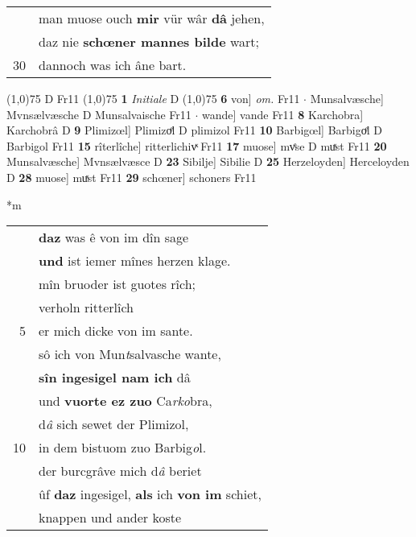 \documentclass[8pt,a4paper,notitlepage]{article}
\begin{document}
\begin{table}[ht]
\begin{minipage}[t]{0.5\linewidth}
\begin{tabular}{rl}
 & man muose ouch \textbf{mir} vür wâr \textbf{dâ} jehen,\\ 
 & daz nie \textbf{schœner mannes bilde} wart;\\ 
30 & dannoch was ich âne bart.\\ 
\end{tabular}
\scriptsize
\line(1,0){75} \newline
D Fr11 \newline
\line(1,0){75} \newline
\textbf{1} \textit{Initiale} D  \newline
\line(1,0){75} \newline
\textbf{6} von] \textit{om.} Fr11  $\cdot$ Munsalvæsche] Mvnsælvæsche D Munsalvaische Fr11  $\cdot$ wande] vande Fr11 \textbf{8} Karchobra] Karchobrâ D \textbf{9} Plimizœl] Plimizoͤl D plimizol Fr11 \textbf{10} Barbigœl] Barbigoͤl D Barbigol Fr11 \textbf{15} rîterlîche] ritterlichivͯ Fr11 \textbf{17} muose] mvͤse D muͯst Fr11 \textbf{20} Munsalvæsche] Mvnsælvæsce D \textbf{23} Sibilje] Sibilie D \textbf{25} Herzeloyden] Herceloyden D \textbf{28} muose] muͯst Fr11 \textbf{29} schœner] schoners Fr11 \newline
\end{minipage}
\hspace{0.5cm}
\begin{minipage}[t]{0.5\linewidth}
\small
\begin{center}*m
\end{center}
\begin{tabular}{rl}
 & \textbf{daz} was ê von im dîn sage\\ 
 & \textbf{und} ist iemer mînes herzen klage.\\ 
 & mîn bruoder ist guotes rîch;\\ 
 & verholn ritterlîch\\ 
5 & er mich dicke von im sante.\\ 
 & sô ich von Mun\textit{t}salvasche wante,\\ 
 & \textbf{sîn ingesigel nam ich} dâ\\ 
 & und \textbf{vuorte ez zuo} Ca\textit{rko}bra,\\ 
 & d\textit{â} sich sewet der Plimizol,\\ 
10 & in dem bistuom zuo Barbig\textit{o}l.\\ 
 & der burcgrâve mich d\textit{â} beriet\\ 
 & ûf \textbf{daz} ingesigel, \textbf{als} ich \textbf{von im} schiet,\\ 
 & knappen und ander koste\\ 

\end{tabular}
\end{minipage}
\end{table}
\end{document}
